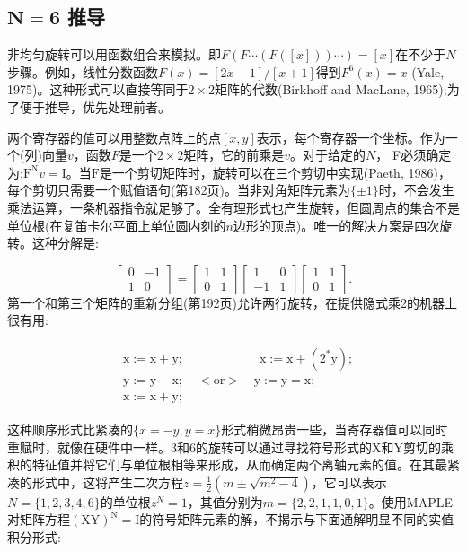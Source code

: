 \begin{CJK}{UTF8}{gbsn}
\subsection*{$\mathbf{N=6}$ 推导}
非均匀旋转可以用函数组合来模拟。即$F(F\cdots(F([x]))\cdots)=[x]$在不少于$N$步骤。例如，线性分数函数$F(x)=\left[2 x-1\right] /[x+1]$得到$F^{6}(x)=x$ (Yale, 1975)。这种形式可以直接等同于$2 \times 2$矩阵的代数(Birkhoff and MacLane, 1965);为了便于推导，优先处理前者。

两个寄存器的值可以用整数点阵上的点$[x, y]$表示，每个寄存器一个坐标。作为一个(列)向量$v$，函数$F$是一个$2 \times 2$矩阵，它的前乘是$v$。对于给定的$N$， F必须确定为:$\mathrm{F}^{\mathrm{N}} v=\mathrm{I}$。当$\mathrm{F}$是一个剪切矩阵时，旋转可以在三个剪切中实现(Paeth, 1986)，每个剪切只需要一个赋值语句(第182页)。当非对角矩阵元素为$\{\pm 1\}$时，不会发生乘法运算，一条机器指令就足够了。全有理形式也产生旋转，但圆周点的集合不是单位根(在复笛卡尔平面上单位圆内刻的$n$边形的顶点)。唯一的解决方案是四次旋转。这种分解是:

$$
\begin{bmatrix}
0 & -1 \\
1 & 0
\end{bmatrix}
=\begin{bmatrix}
1 & 1 \\
0 & 1
\end{bmatrix}
\begin{bmatrix}
 1 & 0 \\
  -1 & 1
\end{bmatrix}
\begin{bmatrix}
1 & 1 \\
0 & 1
\end{bmatrix}.
$$
第一个和第三个矩阵的重新分组(第192页)允许两行旋转，在提供隐式乘2的机器上很有用:


\begin{align}
\begin{aligned}
& \mathrm{x}:=\mathrm{x}+\mathrm{y} ; \qquad \qquad \qquad \mathrm{x}:=\mathrm{x}+\left(2^{*} \mathrm{y}\right) ; \\
& \mathrm{y}:=\mathrm{y}-\mathrm{x} ; \quad < \mathrm{or}>\quad \mathrm{y}:=\mathrm{y}=\mathrm{x} ; \\
& \mathrm{x}:=\mathrm{x}+\mathrm{y} \text {; }
\end{aligned}
\tag{4.1}
\end{align}

这种顺序形式比紧凑的$\{x=-y, y=x\}$形式稍微昂贵一些，当寄存器值可以同时重赋时，就像在硬件中一样。3和6的旋转可以通过寻找符号形式的$\mathrm{X}$和$\mathrm{Y}$剪切的乘积的特征值并将它们与单位根相等来形成，从而确定两个离轴元素的值。在其最紧凑的形式中，这将产生二次方程$z=\frac{1}{2}\left(m \pm \sqrt{m^{2}-4}\right)$，它可以表示$N=\{1,2,3,4,6\}$的单位根$z^{N}=1$，其值分别为$m=\{2,2,1,1,0,1 \}$。使用MAPLE对矩阵方程$(\mathrm{XY})^{\mathrm{N}}=\mathrm{I}$的符号矩阵元素的解，不揭示与下面通解明显不同的实值积分形式:



\end{CJK}
